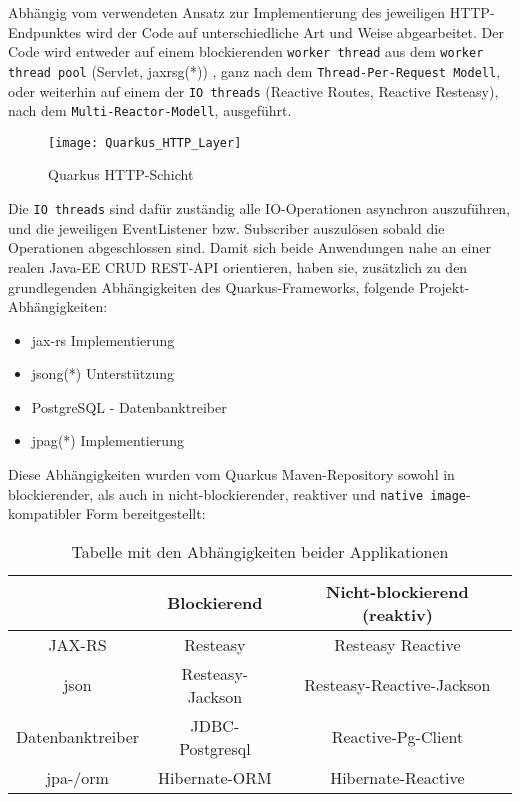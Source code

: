 Abhängig vom verwendeten Ansatz zur Implementierung des jeweiligen HTTP-Endpunktes wird der Code auf unterschiedliche Art und Weise abgearbeitet.
Der Code wird entweder auf einem blockierenden \verb|worker thread| aus dem \verb|worker thread pool| (Servlet, \Gls{jaxrsg}(*))
, ganz nach dem \verb|Thread-Per-Request Modell|, oder weiterhin auf einem der \verb|IO threads| (Reactive Routes, Reactive Resteasy),
nach dem \verb|Multi-Reactor-Modell|, ausgeführt.

\newpage
\begin{figure}[h]
  \centering
  \texttt{[image: Quarkus\_HTTP\_Layer]}
  \caption{Quarkus HTTP-Schicht \parencite{QuarkusReactiveRoutes}}
  \label{fig:quarkus_http_schicht}
\end{figure}

Die \verb|IO threads| sind dafür zuständig alle IO-Operationen asynchron auszuführen, und die jeweiligen EventListener bzw. Subscriber
auszulösen sobald die Operationen abgeschlossen sind.
Damit sich beide Anwendungen nahe an einer realen Java-EE CRUD REST-API orientieren, haben
sie, zusätzlich zu den grundlegenden Abhängigkeiten des Quarkus-Frameworks, folgende Projekt-Abhängigkeiten:
\begin{itemize}
  \item \acrshort{jax-rs} Implementierung
  \item \Gls{jsong}(*) Unterstützung
  \item PostgreSQL - Datenbanktreiber
  \item \Gls{jpag}(*) Implementierung
\end{itemize}

Diese Abhängigkeiten wurden vom Quarkus Maven-Repository sowohl in blockierender,
als auch in nicht-blockierender, reaktiver und \verb|native image|-kompatibler Form bereitgestellt: \parencite{MavenQuarkusIO}
\setlength{\tabcolsep}{18pt}
\renewcommand{\arraystretch}{1.5}
\begin{table}[ht!]
  \centering
  \begin{tabular}{| c | c | c |}
    \hline
                                   & Blockierend      & Nicht-blockierend (reaktiv) \\
    \hline
    JAX-RS                         & Resteasy         & Resteasy Reactive           \\
    \hline
    \acrshort{json}                & Resteasy-Jackson & Resteasy-Reactive-Jackson   \\
    \hline
    Datenbanktreiber               & JDBC-Postgresql  & Reactive-Pg-Client          \\
    \hline
    \acrshort{jpa}-/\acrshort{orm} & Hibernate-ORM    & Hibernate-Reactive          \\
    \hline
  \end{tabular}
  \caption{Tabelle mit den Abhängigkeiten beider Applikationen}
  \label{table:dependencies}
\end{table}

